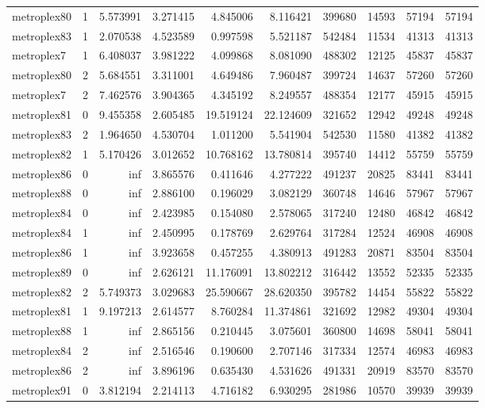 \documentclass[../../../thesis.tex]{subfiles}
\begin{document}
\begin{longtable}{|l|r|r|r|r|r|r|r|r|r|}
metroplex80 & 1 & 5.573991 & 3.271415 & 4.845006 & 8.116421 & 399680 & 14593 & 57194 & 57194 \\
metroplex83 & 1 & 2.070538 & 4.523589 & 0.997598 & 5.521187 & 542484 & 11534 & 41313 & 41313 \\
metroplex7 & 1 & 6.408037 & 3.981222 & 4.099868 & 8.081090 & 488302 & 12125 & 45837 & 45837 \\
metroplex80 & 2 & 5.684551 & 3.311001 & 4.649486 & 7.960487 & 399724 & 14637 & 57260 & 57260 \\
metroplex7 & 2 & 7.462576 & 3.904365 & 4.345192 & 8.249557 & 488354 & 12177 & 45915 & 45915 \\
metroplex81 & 0 & 9.455358 & 2.605485 & 19.519124 & 22.124609 & 321652 & 12942 & 49248 & 49248 \\
metroplex83 & 2 & 1.964650 & 4.530704 & 1.011200 & 5.541904 & 542530 & 11580 & 41382 & 41382 \\
metroplex82 & 1 & 5.170426 & 3.012652 & 10.768162 & 13.780814 & 395740 & 14412 & 55759 & 55759 \\
metroplex86 & 0 & inf & 3.865576 & 0.411646 & 4.277222 & 491237 & 20825 & 83441 & 83441 \\
metroplex88 & 0 & inf & 2.886100 & 0.196029 & 3.082129 & 360748 & 14646 & 57967 & 57967 \\
metroplex84 & 0 & inf & 2.423985 & 0.154080 & 2.578065 & 317240 & 12480 & 46842 & 46842 \\
metroplex84 & 1 & inf & 2.450995 & 0.178769 & 2.629764 & 317284 & 12524 & 46908 & 46908 \\
metroplex86 & 1 & inf & 3.923658 & 0.457255 & 4.380913 & 491283 & 20871 & 83504 & 83504 \\
metroplex89 & 0 & inf & 2.626121 & 11.176091 & 13.802212 & 316442 & 13552 & 52335 & 52335 \\
metroplex82 & 2 & 5.749373 & 3.029683 & 25.590667 & 28.620350 & 395782 & 14454 & 55822 & 55822 \\
metroplex81 & 1 & 9.197213 & 2.614577 & 8.760284 & 11.374861 & 321692 & 12982 & 49304 & 49304 \\
metroplex88 & 1 & inf & 2.865156 & 0.210445 & 3.075601 & 360800 & 14698 & 58041 & 58041 \\
metroplex84 & 2 & inf & 2.516546 & 0.190600 & 2.707146 & 317334 & 12574 & 46983 & 46983 \\
metroplex86 & 2 & inf & 3.896196 & 0.635430 & 4.531626 & 491331 & 20919 & 83570 & 83570 \\
metroplex91 & 0 & 3.812194 & 2.214113 & 4.716182 & 6.930295 & 281986 & 10570 & 39939 & 39939 \\

\end{longtable}
\end{document}
